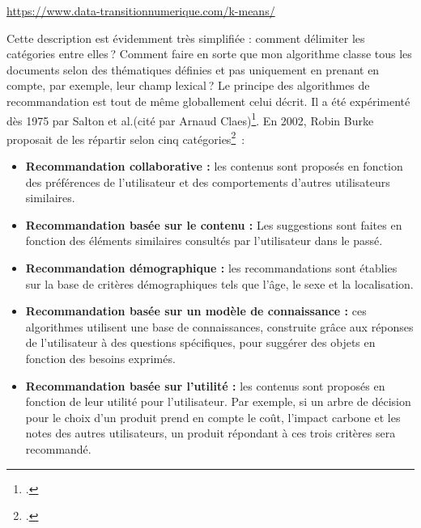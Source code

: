 \begin{center}
	\url{https://www.data-transitionnumerique.com/k-means/}   
\end{center}

Cette description est évidemment très simplifiée : comment délimiter les catégories entre elles ? Comment faire en sorte que mon algorithme classe tous les documents selon des thématiques définies et pas uniquement en prenant en compte, par exemple, leur champ lexical ? Le principe des algorithmes de recommandation est tout de même globallement celui décrit. Il a été expérimenté dès 1975 par Salton et al.(cité par Arnaud Claes)\footcite[p. 38]{claes2022}. En 2002, Robin Burke proposait de les répartir selon cinq catégories\footcite{claes2022} :

\begin{itemize}
	\item \textbf{Recommandation collaborative :} les contenus sont proposés en fonction des préférences de l’utilisateur et des comportements d’autres utilisateurs similaires.
	\item \textbf{Recommandation basée sur le contenu :} Les suggestions sont faites en fonction des éléments similaires consultés par l’utilisateur dans le passé.
	\item \textbf{Recommandation démographique :} les recommandations sont établies sur la base de critères démographiques tels que l’âge, le sexe et la localisation.
	\item \textbf{Recommandation basée sur un modèle de connaissance :} ces algorithmes utilisent une base de connaissances, construite grâce aux réponses de l’utilisateur à des questions spécifiques, pour suggérer des objets en fonction des besoins exprimés.
	\item \textbf{Recommandation basée sur l’utilité : }les contenus sont proposés en fonction de leur utilité pour l’utilisateur. Par exemple, si un arbre de décision pour le choix d’un produit prend en compte le coût, l’impact carbone et les notes des autres utilisateurs, un produit répondant à ces trois critères sera recommandé.
\end{itemize}

